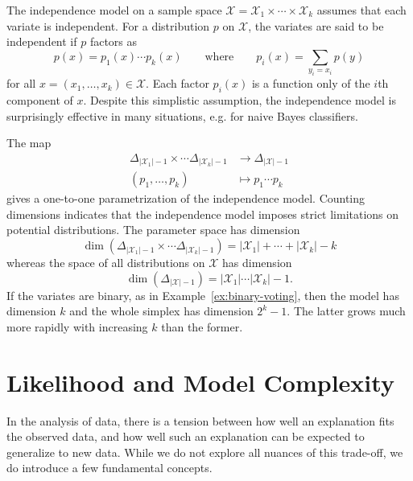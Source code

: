 \documentclass[cclicense]{hmcthesis}
\providecommand*{\xs}{\mathcal X}
\numberwithin{equation}{chapter}
\numberwithin{thmcounter}{chapter}
\begin{document}
    \begin{example}
        The independence model on a sample space $\xs = \xs_1 \times \cdots
        \times \xs_k$ assumes that each variate is independent.  For a
        distribution $p$ on $\xs$, the variates are said to be independent if
        $p$ factors as
        \[
            p(x) = p_1(x) \cdots p_k(x)
            \qquad
            \text{where}
            \qquad
            p_i(x) = \sum_{y_i = x_i} p(y) %
        \]
        for all $x = (x_1, \ldots, x_k) \in \xs$.  Each factor $p_i(x)$ is a
        function only of the $i$th component of $x$.  Despite this simplistic
        assumption, the independence model is surprisingly effective in many
        situations, e.g. for naive Bayes classifiers.  
        
        The map 
        \begin{align*}
        \Delta_{|\xs_1|-1} \times \cdots \Delta_{|\xs_k|-1} 
        &\to \Delta_{|\xs| - 1} \\
        (p_1, \ldots, p_k) &\mapsto p_1 \cdots p_k
        \end{align*}
        gives a one-to-one parametrization of the independence model.  Counting
        dimensions indicates that the independence model imposes strict
        limitations on potential distributions.  The parameter space has
        dimension
        \[
            \dim 
            (\Delta_{|\xs_1|-1} \times \cdots \Delta_{|\xs_k|-1})
            =
            |\xs_1| + \cdots + |\xs_k| - k
        \]
        whereas the space of all distributions on $\xs$ has dimension 
        \[
            \dim(\Delta_{|\xs| - 1})
            =
            |\xs_1| \cdots |\xs_k| - 1.
        \]
        If the variates are binary, as in Example~\ref{ex:binary-voting}, then the
        model has dimension $k$ and the whole simplex has dimension $2^k - 1$.
        The latter grows much more rapidly with increasing $k$ than the former.
        \label{ex:independence1}
    \end{example}
    
\section{Likelihood and Model Complexity}
    In the analysis of data, there is a tension between how well an explanation
    fits the observed data, and how well such an explanation can be expected to
    generalize to new data.  While we do not explore all nuances of this
    trade-off, we do introduce a few fundamental concepts.
\end{document}
